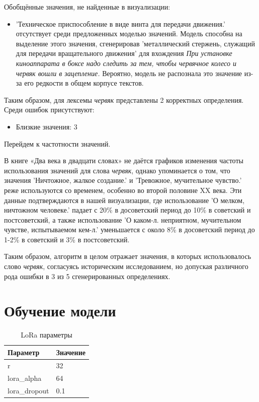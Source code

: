 Обобщённые значения, не найденные в визуализации:
\begin{itemize}
    \item ’Техническое приспособление в виде винта для передачи движения.’ отсутствует среди
предложенных моделью значений.
Модель способна на выделение этого значения, сгенерировав
’металлический стержень, служащий для передачи вращательного движения’ для вхождения
\textit{При установке киноаппарата в боксе надо следить за тем, чтобы червячное колесо и
червяк вошли в зацепление.}
Вероятно, модель не распознала это значение из-за его редкости в общем корпусе текстов.
\end{itemize}

Таким образом, для лексемы \textit{червяк} представлены 2 корректных определения.
Среди ошибок присутствуют:
\begin{itemize}
    \item Близкие значения: 3
\end{itemize}

Перейдем к частотности значений.

В книге «Два века в двадцати словах» не даётся графиков изменения частоты использования значений
для слова \textit{червяк}, однако упоминается о том, что значения
’Ничтожное, жалкое создание.’ и ’Тревожное, мучительное чувство.’
реже используются со временем, особенно во второй половине XX века.
Эти данные подтверждаются в нашей визуализации, где использование
’О мелком, ничтожном человеке.’ падает с 20\% в досоветский период до 10\% в советский и постсоветский,
а также использование ’О каком-л. неприятном, мучительном чувстве, испытываемом кем-л.’
уменьшается с около 8\% в досоветский период до 1-2\% в советский и 3\% в постсоветский.

Таким образом, алгоритм в целом отражает значения, в которых использовалось
слово \textit{червяк}, согласуясь историческим исследованием, но допуская различного рода ошибки
в 3 из 5 сгенерированных определениях.

\chapter{Обучение модели}

\begin{longtable}{ll}
\caption{LoRa параметры} \\
\hline
\textbf{Параметр} & \textbf{Значение} \\
\hline
r & 32 \\
lora\_alpha & 64 \\
lora\_dropout & 0.1 \\
\hline
\end{longtable}

